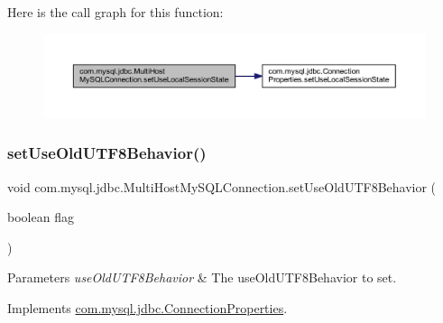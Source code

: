 Here is the call graph for this function\+:
\nopagebreak
\begin{figure}[H]
\begin{center}
\leavevmode
\includegraphics[width=350pt]{classcom_1_1mysql_1_1jdbc_1_1_multi_host_my_s_q_l_connection_a9c5be4608718622501934b5054995bf7_cgraph}
\end{center}
\end{figure}
\mbox{\label{classcom_1_1mysql_1_1jdbc_1_1_multi_host_my_s_q_l_connection_abafab2c58d9f694f0b8d332f19d012f3}} 
\subsubsection{\texorpdfstring{set\+Use\+Old\+U\+T\+F8\+Behavior()}{setUseOldUTF8Behavior()}}
{\footnotesize\ttfamily void com.\+mysql.\+jdbc.\+Multi\+Host\+My\+S\+Q\+L\+Connection.\+set\+Use\+Old\+U\+T\+F8\+Behavior (\begin{DoxyParamCaption}\item[{boolean}]{flag }\end{DoxyParamCaption})}


\begin{DoxyParams}{Parameters}
{\em use\+Old\+U\+T\+F8\+Behavior} & The use\+Old\+U\+T\+F8\+Behavior to set. \\
\hline
\end{DoxyParams}


Implements \mbox{\hyperlink{interfacecom_1_1mysql_1_1jdbc_1_1_connection_properties_a0ae502be4bb0e0dca960587d7883a663}{com.\+mysql.\+jdbc.\+Connection\+Properties}}.

